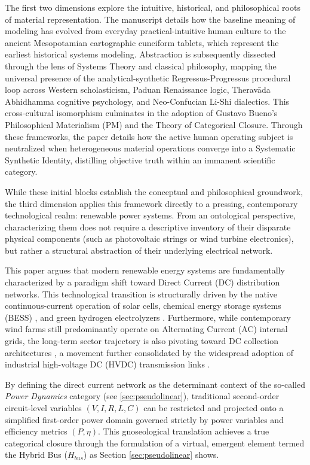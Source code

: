 \documentclass[11pt, a4paper]{article}
\begin{document}
The first two dimensions explore the intuitive, historical, and philosophical roots of material representation. The manuscript details how the baseline meaning of modeling has evolved from everyday practical-intuitive human culture to the ancient Mesopotamian cartographic cuneiform tablets, which represent the earliest historical systems modeling. Abstraction is subsequently dissected through the lens of Systems Theory and classical philosophy, mapping the universal presence of the analytical-synthetic Regressus-Progressus procedural loop across Western scholasticism, Paduan Renaissance logic, Theravāda Abhidhamma cognitive psychology, and Neo-Confucian Li-Shi dialectics. This cross-cultural isomorphism culminates in the adoption of Gustavo Bueno's Philosophical Materialism (PM) and the Theory of Categorical Closure. Through these frameworks, the paper details how the active human operating subject is neutralized when heterogeneous material operations converge into a Systematic Synthetic Identity, distilling objective truth within an immanent scientific category.

While these initial blocks establish the conceptual and philosophical groundwork, the third dimension applies this framework directly to a pressing, contemporary technological realm: renewable power systems. From an ontological perspective, characterizing them does not require a descriptive inventory of their disparate physical components (such as photovoltaic strings or wind turbine electronics), but rather a structural abstraction of their underlying electrical network.

This paper argues that modern renewable energy systems are fundamentally characterized by a paradigm shift toward Direct Current (DC) distribution networks. This technological transition is structurally driven by the native continuous-current operation of solar cells, chemical energy storage systems (BESS) \cite{EnergiesBESS2026}, and green hydrogen electrolyzers \cite{EnergiesElectrolyzer2026}. Furthermore, while contemporary wind farms still predominantly operate on Alternating Current (AC) internal grids, the long-term sector trajectory is also pivoting toward DC collection architectures \cite{Musasa2017Review}, a movement further consolidated by the widespread adoption of industrial high-voltage DC (HVDC) transmission links \cite{EnergiesHVDC2025}.


By defining the direct current network as the determinant context of the so-called \emph{Power Dynamics} category (see \ref{sec:pseudolinear}), traditional second-order circuit-level variables $(V, I, R, L, C)$ can be restricted and projected onto a simplified first-order power domain governed strictly by power variables and efficiency metrics $(P, \eta)$. This gnoseological translation achieves a true categorical closure through the formulation of a virtual, emergent element termed the Hybrid Bus ($H_{bus}$) as Section \ref{sec:pseudolinear} shows.
\end{document}
